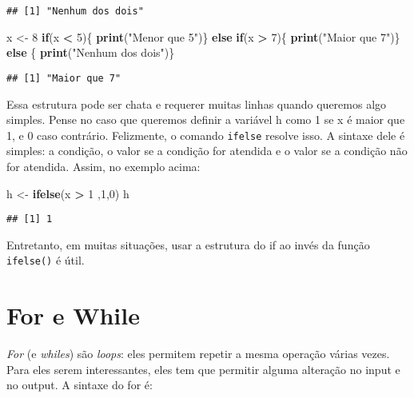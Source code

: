 \documentclass[]{book}
\newenvironment{Shaded}{\begin{snugshade}}{\end{snugshade}}
\newcommand{\KeywordTok}[1]{\textcolor[rgb]{0.13,0.29,0.53}{\textbf{#1}}}
\newcommand{\DecValTok}[1]{\textcolor[rgb]{0.00,0.00,0.81}{#1}}
\newcommand{\StringTok}[1]{\textcolor[rgb]{0.31,0.60,0.02}{#1}}
\newcommand{\ControlFlowTok}[1]{\textcolor[rgb]{0.13,0.29,0.53}{\textbf{#1}}}
\newcommand{\OperatorTok}[1]{\textcolor[rgb]{0.81,0.36,0.00}{\textbf{#1}}}
\newcommand{\NormalTok}[1]{#1}
\begin{document}
\begin{verbatim}
## [1] "Nenhum dos dois"
\end{verbatim}

\begin{Shaded}
\begin{Highlighting}[]
\NormalTok{x <-}\StringTok{ }\DecValTok{8}
\ControlFlowTok{if}\NormalTok{(x }\OperatorTok{<}\StringTok{ }\DecValTok{5}\NormalTok{)\{}
    \KeywordTok{print}\NormalTok{(}\StringTok{"Menor que 5"}\NormalTok{)\} }\ControlFlowTok{else} \ControlFlowTok{if}\NormalTok{(x }\OperatorTok{>}\StringTok{ }\DecValTok{7}\NormalTok{)\{}
    \KeywordTok{print}\NormalTok{(}\StringTok{"Maior que 7"}\NormalTok{)\} }\ControlFlowTok{else}\NormalTok{ \{}
    \KeywordTok{print}\NormalTok{(}\StringTok{"Nenhum dos dois"}\NormalTok{)\}}
\end{Highlighting}
\end{Shaded}

\begin{verbatim}
## [1] "Maior que 7"
\end{verbatim}

Essa estrutura pode ser chata e requerer muitas linhas quando queremos
algo simples. Pense no caso que queremos definir a variável h como 1 se
x é maior que 1, e 0 caso contrário. Felizmente, o comando
\texttt{ifelse} resolve isso. A sintaxe dele é simples: a condição, o
valor se a condição for atendida e o valor se a condição não for
atendida. Assim, no exemplo acima:

\begin{Shaded}
\begin{Highlighting}[]
\NormalTok{h <-}\StringTok{ }\KeywordTok{ifelse}\NormalTok{(x }\OperatorTok{>}\StringTok{ }\DecValTok{1}\NormalTok{ ,}\DecValTok{1}\NormalTok{,}\DecValTok{0}\NormalTok{)}
\NormalTok{h}
\end{Highlighting}
\end{Shaded}

\begin{verbatim}
## [1] 1
\end{verbatim}

Entretanto, em muitas situações, usar a estrutura do if ao invés da
função \texttt{ifelse()} é útil.

\section{For e While}\label{for-e-while}

\emph{For} (e \emph{whiles}) são \emph{loops}: eles permitem repetir a
mesma operação várias vezes. Para eles serem interessantes, eles tem que
permitir alguma alteração no input e no output. A sintaxe do for é:
\end{document}
